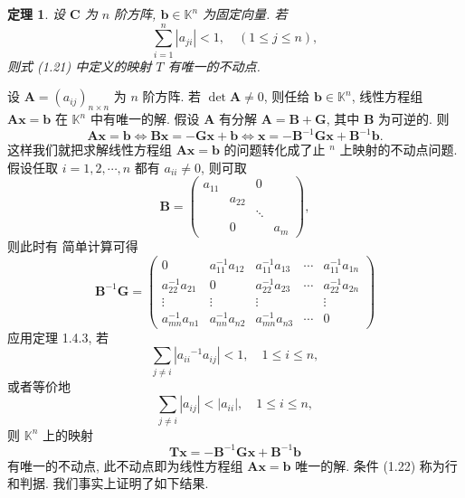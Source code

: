 \documentclass[openany]{ctexbook}
\theoremstyle{kaiti}
\newtheorem{theorem}{定理}[section]
\theoremstyle{normal}
\begin{document}
\begin{theorem}
  设 $\boldsymbol{C}$ 为 $n$ 阶方阵, $\boldsymbol{b} \in \mathbb{K}^n$ 为固定向量. 若
  $$
  \sum_{i=1}^n\left|a_{j i}\right|<1, \quad(1 \leqslant j \leqslant n),
  $$
  则式 (1.21) 中定义的映射 $T$ 有唯一的不动点.
\end{theorem}

设 $\boldsymbol{A}=\left(a_{i j}\right)_{n \times n}$ 为 $n$ 阶方阵. 若 $\operatorname{det} \boldsymbol{A} \neq 0$, 则任给 $\boldsymbol{b} \in \mathbb{K}^n$, 线性方程组 $\boldsymbol{A} \boldsymbol{x}=\boldsymbol{b}$ 在 $\mathbb{K}^n$ 中有唯一的解. 假设 $\boldsymbol{A}$ 有分解 $\boldsymbol{A}=\boldsymbol{B}+\boldsymbol{G}$, 其中 $\boldsymbol{B}$ 为可逆的. 则
$$
\boldsymbol{A} \boldsymbol{x}=\boldsymbol{b} \Leftrightarrow \boldsymbol{B} \boldsymbol{x}=-\boldsymbol{G} \boldsymbol{x}+\boldsymbol{b} \Leftrightarrow \boldsymbol{x}=-\boldsymbol{B}^{-1} \boldsymbol{G} \boldsymbol{x}+\boldsymbol{B}^{-1} \boldsymbol{b}.
$$
这样我们就把求解线性方程组 $\boldsymbol{A x}=\boldsymbol{b}$ 的问题转化成了止 ${ }^n$ 上映射的不动点问题. 假设任取 $i=1,2, \cdots, n$ 都有 $a_{i i} \neq 0$, 则可取
$$
\boldsymbol{B}=\left(\begin{array}{cccc}
a_{11} & & 0 & \\
& a_{22} & & \\
& & \ddots & \\
& 0 & & a_m
\end{array}\right),
$$
则此时有
简单计算可得
$$
\boldsymbol{B}^{-1} \boldsymbol{G}=\left(\begin{array}{ccccc}
0 & a_{11}^{-1} a_{12} & a_{11}^{-1} a_{13} & \cdots & a_{11}^{-1} a_{1 n} \\
a_{22}^{-1} a_{21} & 0 & a_{22}^{-1} a_{23} & \cdots & a_{22}^{-1} a_{2 n} \\
\vdots & \vdots & \vdots & & \vdots \\
a_{m n}^{-1} a_{n 1} & a_{n n}^{-1} a_{n 2} & a_{m n}^{-1} a_{n 3} & \cdots & 0
\end{array}\right)
$$
应用定理 1.4.3, 若
$$
\sum_{j \neq i}\left|a_{i i}{ }^{-1} a_{i j}\right|<1, \quad 1 \leqslant i \leqslant n,
$$
或者等价地
\begin{equation}
  \sum_{j \neq i}\left|a_{i j}\right|<\left|a_{i i}\right|, \quad 1 \leqslant i \leqslant n,
\end{equation}
则 $\mathbb{K}^n$ 上的映射
\begin{equation}
  \boldsymbol{T} \boldsymbol{x}=-\boldsymbol{B}^{-1} \boldsymbol{G} \boldsymbol{x}+\boldsymbol{B}^{-1} \boldsymbol{b}
\end{equation}
有唯一的不动点, 此不动点即为线性方程组 $\boldsymbol{Ax}=\boldsymbol{b}$ 唯一的解. 条件 (1.22) 称为行和判据. 我们事实上证明了如下结果.
\end{document}
